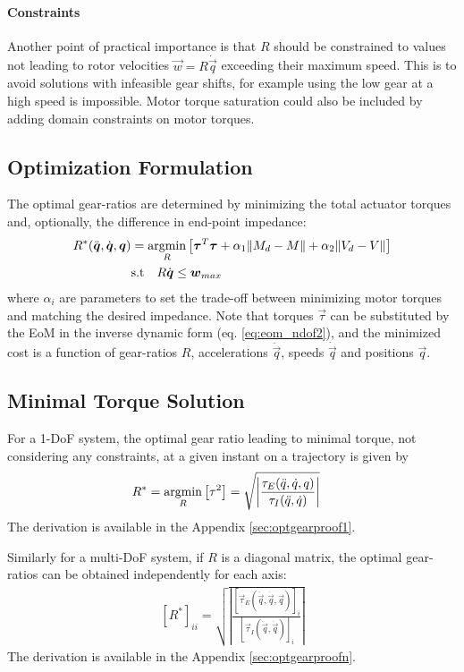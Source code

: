 \paragraph{Constraints}
Another point of practical importance is that $R$ should be constrained to values not leading to rotor velocities $\vec{w}=R \dot{\vec{q}}$ exceeding their maximum speed. This is to avoid solutions with infeasible gear shifts, for example using the low gear at a high speed is impossible. Motor torque saturation could also be included by adding domain constraints on motor torques.

\subsection{Optimization Formulation}
The optimal gear-ratios are determined by minimizing the total actuator torques and, optionally, the difference in end-point impedance:
%
\begin{align}
	R^{*}(\ddot{\vec{q}},\dot{\vec{q}},\vec{q}) &= \operatornamewithlimits{argmin}\limits_{R} \left[ \vec{\tau}^T \vec{\tau} + \alpha_1 \| M_{d} - M \| + \alpha_2 \| V_{d} - V \| \right]  \\
	& \text{s.t}  \quad R \dot{\vec{q}} \leq \vec{w}_{max} 
\label{eq:rmin_general}
\end{align}
%
where $\alpha_i$ are parameters to set the trade-off between minimizing motor torques and matching the desired impedance. Note that torques $\vec{\tau}$ can be substituted by the EoM in the inverse dynamic form (eq. \eqref{eq:eom_ndof2}), and the minimized cost is a function of gear-ratios $R$, accelerations $\ddot{\vec{q}}$, speeds $\dot{\vec{q}}$ and positions $\vec{q}$. 
%

\subsection{Minimal Torque Solution}

For a 1-DoF system, the optimal gear ratio leading to minimal torque, not considering any constraints, at a given instant on a trajectory is given by
%
\begin{align}
	R^{*} &= \operatornamewithlimits{argmin}\limits_{R} \left[ \tau^2 \right] = \sqrt{ \left | \frac{\tau_{E}(\ddot{q},\dot{q},q)}{\tau_{I}(\ddot{q},\dot{q})} \right |   } 
\label{eq:aaa}
\end{align}
%
The derivation is available in the Appendix \ref{sec:optgearproof1}.

Similarly for a multi-DoF system, if $R$ is a diagonal matrix, the optimal gear-ratios can be obtained independently for each axis:
%
\begin{align}
	[R^*]_{ii} = \sqrt{ \left | \frac{ [\vec{\tau}_{E}(\ddot{\vec{q}},\dot{\vec{q}},\vec{q})]_i }{ [\vec{\tau}_{I}(\ddot{\vec{q}},\dot{\vec{q}})]_i } \right | }
 \label{eq:rmin2}
\end{align}
%
The derivation is available in the Appendix \ref{sec:optgearproofn}.


